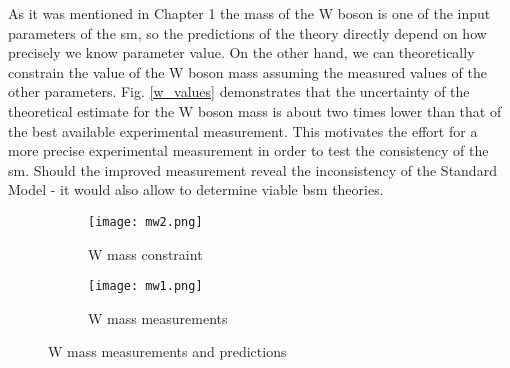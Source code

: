     As it was mentioned in Chapter 1 the mass of the W boson is one of the input parameters of the \gls{sm}, so the predictions of the theory directly depend on how precisely we know parameter value. On the other hand, we can theoretically constrain the value of the W boson mass assuming the measured values of the other parameters. Fig. \ref{w_values} demonstrates that the uncertainty of the theoretical estimate for the W boson mass is about two times lower than that of the best available experimental measurement. This motivates the effort for a more precise experimental measurement in order to test the consistency of the \gls{sm}. Should the improved measurement reveal the inconsistency of the Standard Model - it would also allow to determine viable \gls{bsm} theories. 
    	\begin{figure}[htbp]
    	\begin{subfigure}[t]{0.48\textwidth}
    		\texttt{[image: mw2.png]}
    		\caption[Side view]{W mass constraint}
    		\label{fig::w_constraint}
    	\end{subfigure}
    	\hfill
    	\begin{subfigure}[t]{0.48\textwidth} 
    		\texttt{[image: mw1.png]}
    		\caption[Transverse view]{W mass measurements}
    		\label{fig::w_measurement}
    	\end{subfigure}
    	\caption{W mass measurements and predictions}
    	\label{fig::w_values}
    \end{figure}
